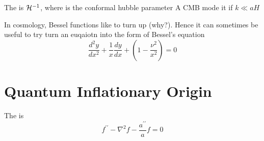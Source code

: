 \documentclass{article}
\begin{document}
\begin{definition}
The  is $\mathcal{H}^{-1}$, where
is the conformal hubble parameter
A CMB mode it  if $k\ll aH$
\end{definition}


\begin{remark}
In cosmology, Bessel functions like to turn up (why?). Hence it can sometimes be useful to try turn an euqaiotn into the form of Bessel's equation 
\[
\frac{d^2y}{dx^2} + \frac{1}{x} \frac{dy}{dx} + \left( 1-\frac{\nu^2}{x^2} \right ) = 0 
\]
\end{remark}


\section{Quantum Inflationary Origin}

\begin{definition}
The  is 
\[
f ^ { \prime \prime } - \nabla ^ { 2 } f - \frac { a ^ { \prime \prime } } { a } f = 0
\]
\end{definition}
\end{document}
